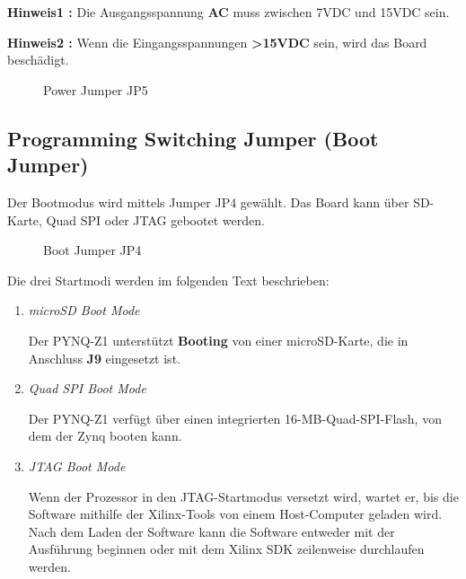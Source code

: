 \documentclass[a4paper]{report}
\begin{document}
\textbf{Hinweis1 :} Die Ausgangsspannung \textbf{AC} muss zwischen 7VDC und 15VDC sein.
	
\textbf{Hinweis2 :} Wenn die Eingangsspannungen \textbf{>15VDC} sein, wird das Board beschädigt.



	\begin{figure}[H]
	\centering
	\caption{Power Jumper JP5}
	\label{Power_Jumper}
	\end{figure}



\subsection{Programming Switching Jumper (Boot Jumper)}

Der Bootmodus wird mittels Jumper JP4 gewählt. Das Board kann über SD-Karte, Quad SPI oder JTAG gebootet werden.

	\begin{figure}[H]
	\centering
	\caption{Boot Jumper JP4}
	\label{Boot_Jumperr}
	\end{figure}

Die drei Startmodi werden im folgenden Text beschrieben: 

	\begin{enumerate} 
	\item   \textit{microSD Boot Mode}
	
	Der PYNQ-Z1 unterstützt \textbf{Booting} von einer microSD-Karte, die in Anschluss \textbf{J9} eingesetzt ist.
	
	\item  \textit{Quad SPI Boot Mode}
	
	Der PYNQ-Z1 verfügt über einen integrierten 16-MB-Quad-SPI-Flash, von dem der Zynq booten kann.
	
	\item  \textit{JTAG Boot Mode}
	
	Wenn der Prozessor in den JTAG-Startmodus versetzt wird, wartet er, bis die Software mithilfe der Xilinx-Tools von einem Host-Computer geladen wird.\\
Nach dem Laden der Software kann die Software entweder mit der Ausführung beginnen oder mit dem Xilinx SDK zeilenweise durchlaufen werden.
	\end{enumerate}
\end{document}

